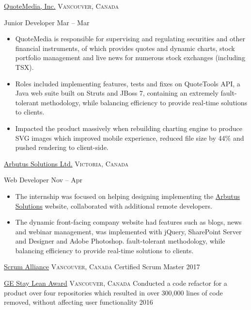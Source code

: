 \documentclass[10pt,a4paper]{article}
\begin{document}
\headedsection  %
  {\href{https://www.quotemedia.com/}{QuoteMedia, Inc.}}
  {\textsc{Vancouver, Canada}} {
  \headedsubsection
    {Junior Developer}
    {Mar  -- Mar }
    {\noindent\begin{itemize}  
\item QuoteMedia is responsible for supervising and regulating securities and other financial instruments, of which provides quotes and dynamic charts, stock portfolio management and live news for numerous stock exchanges (including TSX).
\item Roles included implementing features, tests and fixes on QuoteTools API, a Java web suite built on Struts and JBoss 7, containing an extremely
fault-tolerant methodology, while balancing efficiency to provide real-time solutions to clients.
\item Impacted the product massively when rebuilding charting engine to produce SVG images which improved mobile
experience, reduced file size by 44\% and pushed rendering to client-side.
\end{itemize}}
}

\headedsection  %
  {\href{http://arbutussolutions.com/}{Arbutus Solutions Ltd.}}
  {\textsc{Victoria, Canada}} {
  \headedsubsection
    {Web Developer}
    {Nov  -- Apr }
    {\noindent\begin{itemize}  
\item The internship was focused on helping designing implementing the \href{http://arbutussolutions.com/}{Arbutus Solutions} website, collaborated with additional remote developers.
\item The dynamic front-facing company website had features such as blogs, news and webinar management, was implemented with jQuery, SharePoint Server and Designer and Adobe Photoshop.
fault-tolerant methodology, while balancing efficiency to provide real-time solutions to clients.
\end{itemize}}
}

\spacedhrule{0.5em}{-0.4em}

\headedsection
  {\href{https://www.scrumalliance.org/}{Scrum Alliance}}
  {\textsc{Vancouver, Canada}} {
  \headedsubsection
    {Certified Scrum Master}
    {2017}
    {}
}

\headedsection
  {\href{https://www.ge.com}{GE Stay Lean Award}}
  {\textsc{Vancouver, Canada}} {
  \headedsubsection
    {Conducted a code refactor for a product over four repositories which resulted in over 300,000 lines of code removed, without affecting user functionality }
    {2016}
    {}
}
\end{document}

